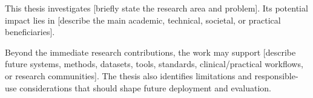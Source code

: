 
This thesis investigates [briefly state the research area and problem]. Its potential impact lies in [describe the main academic, technical, societal, or practical beneficiaries].

Beyond the immediate research contributions, the work may support [describe future systems, methods, datasets, tools, standards, clinical/practical workflows, or research communities]. The thesis also identifies limitations and responsible-use considerations that should shape future deployment and evaluation.
